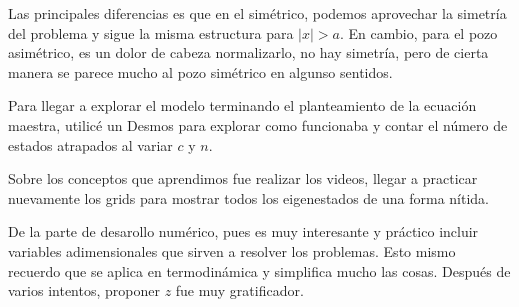 

Las principales diferencias es que en el simétrico, podemos aprovechar la simetría del problema y sigue la misma estructura para $|x|>a$. En cambio, para el pozo asimétrico, es un dolor de cabeza normalizarlo, no hay simetría, pero de cierta manera se parece mucho al pozo simétrico en algunso sentidos.

Para llegar a explorar el modelo terminando el planteamiento de la ecuación maestra, utilicé un Desmos para explorar como funcionaba y contar el número de estados atrapados al variar $c$ y $n$.


Sobre los conceptos que aprendimos fue realizar los videos, llegar a practicar nuevamente los grids para mostrar todos los eigenestados de una forma nítida. 

De la parte de desarollo numérico, pues es muy interesante y práctico incluir  variables adimensionales que sirven a resolver los problemas.  Esto mismo recuerdo que se aplica en termodinámica y simplifica mucho las cosas. Después de varios intentos, proponer $z$ fue muy gratificador.
